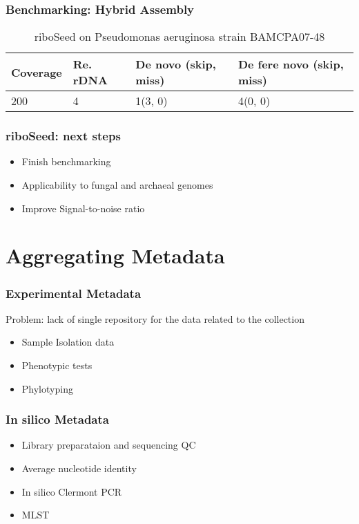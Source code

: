 \documentclass[10pt, compress]{beamer}
\begin{document}
\begin{frame}[fragile]
  \frametitle{Benchmarking: Hybrid Assembly}
\begin{table}[]
\centering
\caption{riboSeed on Pseudomonas aeruginosa strain BAMCPA07-48 }
\begin{tabular}{llll}
  Coverage & Re. rDNA &	De novo (skip, miss) &	De fere novo (skip, miss)   \\
  \hline
  200    & 4  & 1(3, 0)  & 4(0, 0)  \\
\end{tabular}
\end{table}
\end{frame}




\begin{frame}[fragile]
  \frametitle{riboSeed: next steps}
  \begin{itemize}
  \item Finish benchmarking
  \item  Applicability to fungal and archaeal genomes
  \item Improve Signal-to-noise ratio
  \end{itemize}
\end{frame}



\section{Aggregating Metadata}
\begin{frame}[fragile]
  \frametitle{ Experimental Metadata}
  Problem: lack of single repository for the data related to the collection
  \begin{itemize}
  \item Sample Isolation data
  \item Phenotypic tests
    \item Phylotyping
  \end{itemize}
\end{frame}

\begin{frame}[fragile]
  \frametitle{In silico  Metadata}
  \begin{itemize}
  \item Library preparataion and sequencing QC
  \item Average nucleotide identity
  \item In silico Clermont PCR
  \item MLST
    \end{itemize}
\end{frame}
\end{document}
